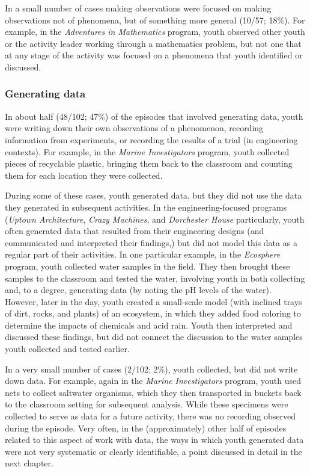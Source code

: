 \documentclass[]{msu-thesis}
\theoremstyle{definition}
\theoremstyle{definition}
\theoremstyle{definition}
\theoremstyle{remark}
\begin{document}
In a small number of cases making observations were focused on making
observations not of phenomena, but of something more general (10/57;
18\%). For example, in the \emph{Adventures in Mathematics} program,
youth observed other youth or the activity leader working through a
mathematics problem, but not one that at any stage of the activity was
focused on a phenomena that youth identified or discussed.

\subsubsection{Generating data}\label{generating-data}

In about half (48/102; 47\%) of the episodes that involved generating
data, youth were writing down their own observations of a phenomenon,
recording information from experiments, or recording the results of a
trial (in engineering contexts). For example, in the \emph{Marine
Investigators} program, youth collected pieces of recyclable plastic,
bringing them back to the classroom and counting them for each location
they were collected.

During some of these cases, youth generated data, but they did not use
the data they generated in subsequent activities. In the
engineering-focused programs (\emph{Uptown Architecture}, \emph{Crazy
Machines}, and \emph{Dorchester House} particularly, youth often
generated data that resulted from their engineering designs (and
communicated and interpreted their findings,) but did not model this
data as a regular part of their activities. In one particular example,
in the \emph{Ecosphere} program, youth collected water samples in the
field. They then brought these samples to the classroom and tested the
water, involving youth in both collecting and, to a degree, generating
data (by noting the pH levels of the water). However, later in the day,
youth created a small-scale model (with inclined trays of dirt, rocks,
and plants) of an ecosystem, in which they added food coloring to
determine the impacts of chemicals and acid rain. Youth then interpreted
and discussed these findings, but did not connect the discussion to the
water samples youth collected and tested earlier.

In a very small number of cases (2/102; 2\%), youth collected, but did
not write down data. For example, again in the \emph{Marine
Investigators} program, youth used nets to collect saltwater organisms,
which they then transported in buckets back to the classroom setting for
subsequent analysis. While these specimens were collected to serve as
data for a future activity, there was no recording observed during the
episode. Very often, in the (approximately) other half of episodes
related to this aspect of work with data, the ways in which youth
generated data were not very systematic or clearly identifiable, a point
discussed in detail in the next chapter.
\end{document}
